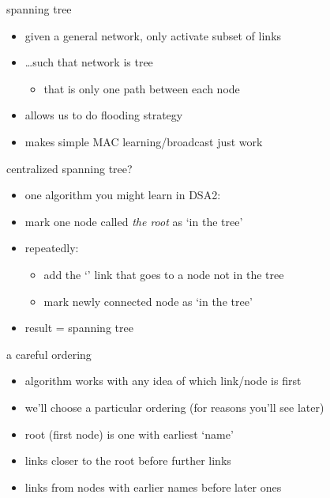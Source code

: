 \usetikzlibrary{arrows.meta,calc,matrix,shapes}
\providecommand{\computer}{%
    \texttt{[image: ../common/Noun\_project\_216.pdf]}
}
\providecommand{\switch}{%
    \texttt{[image: ../common/fig-switch.pdf]}
}
\providecommand{\router}{%
    \texttt{[image: ../common/fig-router.pdf]}
}

\begin{frame}{spanning tree}
    \begin{itemize}
    \item given a general network, only activate subset of links
    \item \ldots such that network is tree
        \begin{itemize}
        \item that is only one path between each node
        \end{itemize}
    \vspace{.5cm}
    \item allows us to do flooding strategy
    \item makes simple MAC learning/broadcast just work
    \end{itemize}
\end{frame}

\begin{frame}{centralized spanning tree?}
    \begin{itemize}
    \item one algorithm you might learn in DSA2:
    \vspace{.5cm}
    \item mark one node called \textit{the root} as `in the tree'
    \item repeatedly: 
        \begin{itemize}
        \item add the `' link that goes to a node not in the tree
        \item mark newly connected node as `in the tree'
        \end{itemize}
    \vspace{.5cm}
    \item result = spanning tree
    \end{itemize}
\end{frame}

\begin{frame}{a careful ordering}
    \begin{itemize}
    \item algorithm works with any idea of which link/node is first
    \vspace{.5cm}
    \item we'll choose a particular ordering (for reasons you'll see later)
    \vspace{.5cm}
    \item root (first node) is one with earliest `name'
    \item links closer to the root before further links
    \item links from nodes with earlier names before later ones
    \end{itemize}
\end{frame}

